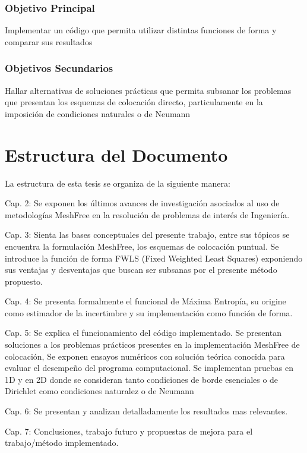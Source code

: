 \subsubsection{Objetivo Principal}
\begin{itemize*}
    \item Implementar un código que permita utilizar distintas funciones de forma y comparar sus resultados
\end{itemize*}
\subsubsection{Objetivos Secundarios}
\begin{itemize*}
    \item Hallar alternativas de soluciones prácticas que permita subsanar los problemas que presentan los esquemas de colocación directo, particulamente en la imposición de condiciones naturales o de Neumann
\end{itemize*}
\newpage
\section{Estructura del Documento}
La estructura de esta tesis se organiza de la siguiente manera:
\begin{itemize*}
	\item Cap. 2: Se exponen los últimos avances de investigación asociados al uso de metodologías MeshFree en la resolución de problemas de interés de Ingeniería. 
        \item Cap. 3: Sienta las bases conceptuales del presente trabajo, entre sus tópicos se encuentra la formulación MeshFree, los esquemas de colocación puntual. Se introduce la función de forma FWLS (Fixed Weighted Least Squares) exponiendo sus ventajas y desventajas que buscan ser subsanas por el presente método propuesto. 
	\item Cap. 4: Se presenta formalmente el funcional de Máxima Entropía, su origine como estimador de la incertimbre y su implementación como función de forma.
	\item Cap. 5: Se explica el funcionamiento del código implementado. Se presentan soluciones a los problemas prácticos presentes en la implementación MeshFree de colocación, Se exponen ensayos numéricos con solución teórica conocida para evaluar el desempeño del programa computacional. Se implementan pruebas en 1D y en 2D donde se consideran tanto condiciones de borde esenciales o de Dirichlet como condiciones naturalez o de Neumann
	\item Cap. 6: Se presentan y analizan detalladamente los resultados mas relevantes.
	\item Cap. 7: Conclusiones, trabajo futuro y propuestas de mejora para el trabajo/método implementado.
\end{itemize*}
